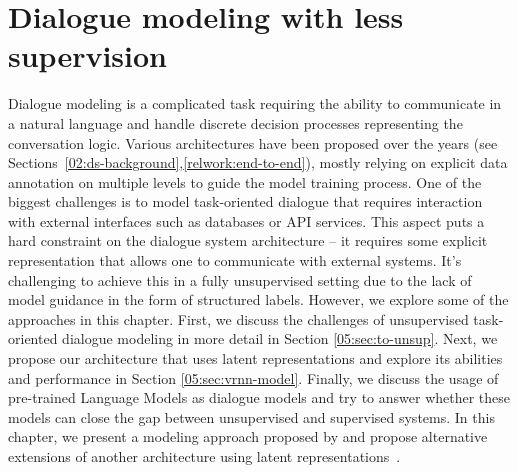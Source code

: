 \chapter{Dialogue modeling with less supervision}%
\label{chap:modeling}
Dialogue modeling is a complicated task requiring the ability to communicate in a natural language and handle discrete decision processes representing the conversation logic.
Various architectures have been proposed over the years (see Sections~\ref{02:ds-background},\ref{relwork:end-to-end}), mostly relying on explicit data annotation on multiple levels to guide the model training process.
One of the biggest challenges is to model task-oriented dialogue that requires interaction with external interfaces such as databases or API services.
This aspect puts a hard constraint on the dialogue system architecture -- it requires some explicit representation that allows one to communicate with external systems.
It's challenging to achieve this in a fully unsupervised setting due to the lack of model guidance in the form of structured labels.
However, we explore some of the approaches in this chapter.
First, we discuss the challenges of unsupervised task-oriented dialogue modeling in more detail in Section \ref{05:sec:to-unsup}.
Next, we propose our architecture that uses latent representations and explore its abilities and performance in Section \ref{05:sec:vrnn-model}.
Finally, we discuss the usage of pre-trained Language Models as dialogue models and try to answer whether these models can close the gap between unsupervised and supervised systems.
In this chapter, we present a modeling approach proposed by \citet{hudecek-dusek-2022-learning} and propose alternative extensions of another architecture using latent representations~\citep{lubis-etal-2022-dialogue}. 


